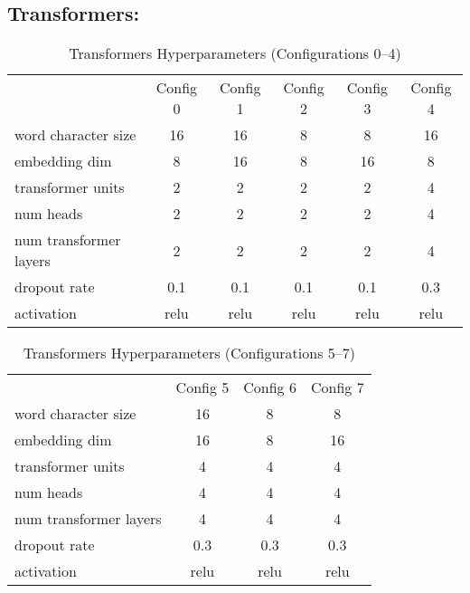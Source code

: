     \subsection{Transformers:}
        \begin{table}[ht]
            \centering
            \caption{Transformers Hyperparameters (Configurations 0–4)}
            \begin{tabular}{lccccc}
                & Config 0 & Config 1 & Config 2 & Config 3 & Config 4 \\
                word character size & 16 & 16 & 8 & 8 & 16 \\
                embedding dim & 8 & 16 & 8 & 16 & 8 \\
                transformer units & 2 & 2 & 2 & 2 & 4 \\
                num heads & 2 & 2 & 2 & 2 & 4 \\
                num transformer layers & 2 & 2 & 2 & 2 & 4 \\
                dropout rate & 0.1 & 0.1 & 0.1 & 0.1 & 0.3 \\
                activation & relu & relu & relu & relu & relu \\
            \end{tabular}
        \end{table}

        \begin{table}[ht]
            \centering
            \caption{Transformers Hyperparameters (Configurations 5–7)}
            \begin{tabular}{lccc}
                & Config 5 & Config 6 & Config 7 \\
                word character size & 16 & 8 & 8 \\
                embedding dim & 16 & 8 & 16 \\
                transformer units & 4 & 4 & 4 \\
                num heads & 4 & 4 & 4 \\
                num transformer layers & 4 & 4 & 4 \\
                dropout rate & 0.3 & 0.3 & 0.3 \\
                activation & relu & relu & relu \\
            \end{tabular}
        \end{table}


